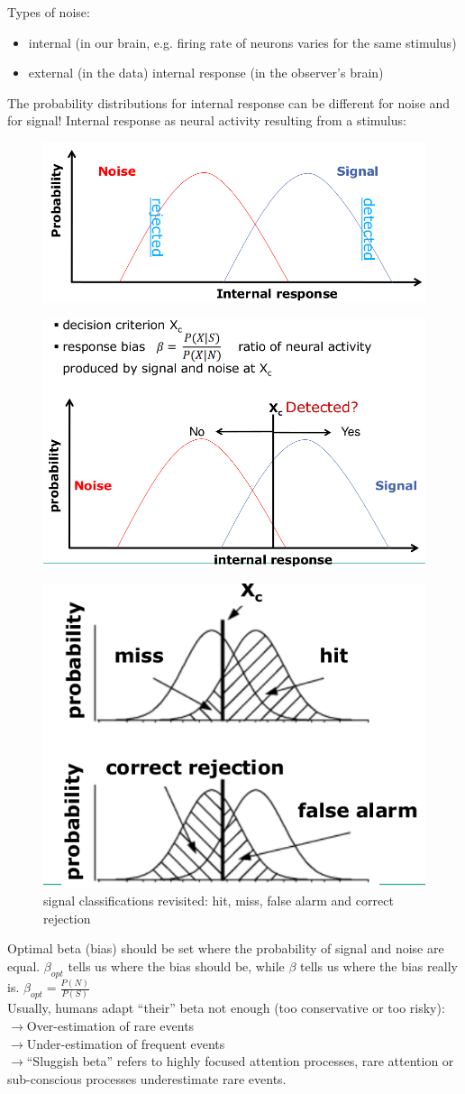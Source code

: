 Types of noise:
\begin{itemize}
\item internal (in our brain, e.g. firing rate of neurons varies for the same stimulus)
\item external (in the data) internal response (in the observer’s brain)
\end{itemize}
The probability distributions for internal response can be different for noise and for signal! Internal response as neural activity resulting from a stimulus:
\begin{figure}[h!]
	\centering
	\includegraphics[width=.5\textwidth]{img/ch03_std.png}
	\caption{}
	\label{std}
\end{figure} 
\begin{figure}[h!]
	\centering
	\includegraphics[width=.5\textwidth]{img/ch03_std1.png}
	\caption{}
	\label{std1}
\end{figure} 
\begin{figure}[h!]
	\centering
	\includegraphics[width=.3\textwidth]{img/ch03_std2.png}
	\caption{signal classifications revisited: hit, miss, false alarm and correct rejection}
	\label{std2}
\end{figure} 
Optimal beta (bias) should be set where the probability of signal and noise are equal. $\beta_{opt}$ tells us where the bias should be, while $\beta$ tells
us where the bias really is. $\beta_{opt} = \frac{P(N)}{P(S)}$\\
Usually, humans adapt ``their'' beta not enough (too conservative or too risky):\\
$\rightarrow$Over-estimation of rare events\\
$\rightarrow$Under-estimation of frequent events\\
$\rightarrow$``Sluggish beta'' refers to highly focused attention processes, rare attention or sub-conscious processes underestimate rare events.\\


